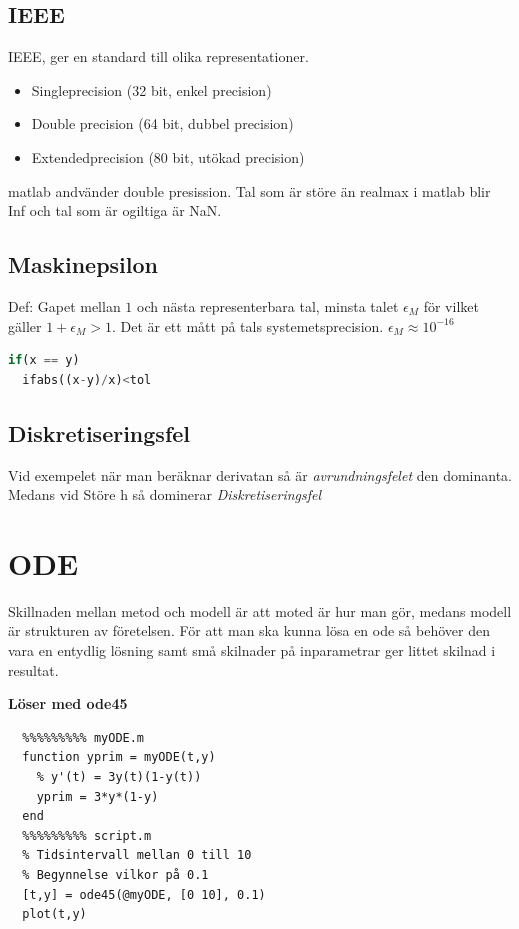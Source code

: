 \begin{multicols}{2}
\subsection{IEEE}
IEEE, ger en standard till olika representationer.
\begin{itemize}
  \item Singleprecision (32 bit, enkel precision)
  \item Double precision (64 bit, dubbel precision)
  \item Extendedprecision (80 bit, utökad precision)
\end{itemize}
matlab andvänder double presission.
Tal som är störe än realmax i matlab blir Inf och tal som är ogiltiga är NaN.

\subsection{Maskinepsilon}
Def: Gapet mellan $1$ och nästa representerbara tal, minsta talet $\epsilon_M$ för vilket
gäller $1+\epsilon_M > 1$. Det är ett mått på tals systemetsprecision. $\epsilon_M \approx 10^{-16}$

\begin{lstlisting}[language=Python]
  if(x == y)
  ifabs((x-y)/x)<tol
\end{lstlisting}

\subsection{Diskretiseringsfel}
Vid exempelet när man beräknar derivatan så är \textit{avrundningsfelet} den dominanta. Medans
vid Störe h så dominerar \textit{Diskretiseringsfel}

\section{ODE}
Skillnaden mellan metod och modell är att moted är hur man gör, 
medans modell är strukturen av företelsen.
För att man ska kunna lösa en ode så behöver den vara en entydlig 
lösning samt små skilnader på inparametrar ger littet skilnad i resultat.

\textbf{Löser med ode45}
\begin{verbatim}
  %%%%%%%%% myODE.m
  function yprim = myODE(t,y)
    % y'(t) = 3y(t)(1-y(t))
    yprim = 3*y*(1-y)
  end
  %%%%%%%%% script.m
  % Tidsintervall mellan 0 till 10
  % Begynnelse vilkor på 0.1
  [t,y] = ode45(@myODE, [0 10], 0.1)
  plot(t,y)
\end{verbatim}


\end{multicols}

